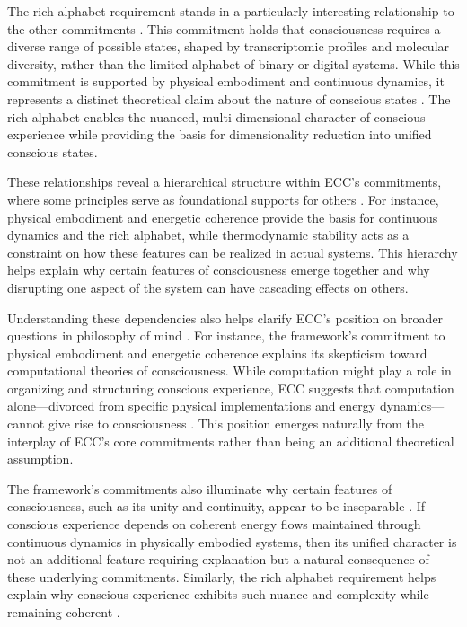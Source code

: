 \begin{refsection}
The rich alphabet requirement stands in a particularly interesting relationship to the other commitments \cite{hurley1998consciousness}. This commitment holds that consciousness requires a diverse range of possible states, shaped by transcriptomic profiles and molecular diversity, rather than the limited alphabet of binary or digital systems. While this commitment is supported by physical embodiment and continuous dynamics, it represents a distinct theoretical claim about the nature of conscious states \cite{haugeland1993mind}. The rich alphabet enables the nuanced, multi-dimensional character of conscious experience while providing the basis for dimensionality reduction into unified conscious states.

These relationships reveal a hierarchical structure within ECC's commitments, where some principles serve as foundational supports for others \cite{kirchhoff2019extended}. For instance, physical embodiment and energetic coherence provide the basis for continuous dynamics and the rich alphabet, while thermodynamic stability acts as a constraint on how these features can be realized in actual systems. This hierarchy helps explain why certain features of consciousness emerge together and why disrupting one aspect of the system can have cascading effects on others.

Understanding these dependencies also helps clarify ECC's position on broader questions in philosophy of mind \cite{clark2013whatever}. For instance, the framework's commitment to physical embodiment and energetic coherence explains its skepticism toward computational theories of consciousness. While computation might play a role in organizing and structuring conscious experience, ECC suggests that computation alone—divorced from specific physical implementations and energy dynamics—cannot give rise to consciousness \cite{varela1991embodied}. This position emerges naturally from the interplay of ECC's core commitments rather than being an additional theoretical assumption.

The framework's commitments also illuminate why certain features of consciousness, such as its unity and continuity, appear to be inseparable \cite{thompson2007mind}. If conscious experience depends on coherent energy flows maintained through continuous dynamics in physically embodied systems, then its unified character is not an additional feature requiring explanation but a natural consequence of these underlying commitments. Similarly, the rich alphabet requirement helps explain why conscious experience exhibits such nuance and complexity while remaining coherent \cite{di2017sensorimotor}.


\end{refsection}
